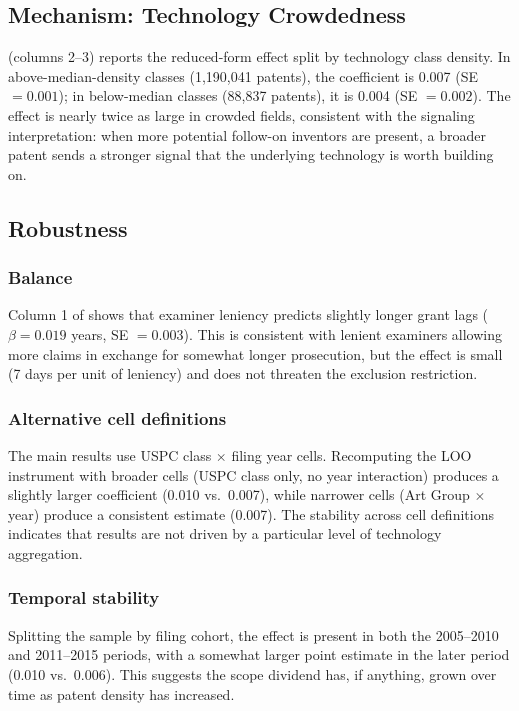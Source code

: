 \documentclass[12pt]{article}
\begin{document}
\subsection{Mechanism: Technology Crowdedness}

 (columns 2--3) reports the reduced-form effect split by technology class density. In above-median-density classes (1,190,041 patents), the coefficient is 0.007 (SE $= 0.001$); in below-median classes (88,837 patents), it is 0.004 (SE $= 0.002$). The effect is nearly twice as large in crowded fields, consistent with the signaling interpretation: when more potential follow-on inventors are present, a broader patent sends a stronger signal that the underlying technology is worth building on.

\subsection{Robustness}



\subsubsection*{Balance} Column 1 of  shows that examiner leniency predicts slightly longer grant lags ($\beta = 0.019$ years, SE $= 0.003$). This is consistent with lenient examiners allowing more claims in exchange for somewhat longer prosecution, but the effect is small (7 days per unit of leniency) and does not threaten the exclusion restriction.

\subsubsection*{Alternative cell definitions} The main results use USPC class $\times$ filing year cells. Recomputing the LOO instrument with broader cells (USPC class only, no year interaction) produces a slightly larger coefficient (0.010 vs.\ 0.007), while narrower cells (Art Group $\times$ year) produce a consistent estimate (0.007). The stability across cell definitions indicates that results are not driven by a particular level of technology aggregation.

\subsubsection*{Temporal stability} Splitting the sample by filing cohort, the effect is present in both the 2005--2010 and 2011--2015 periods, with a somewhat larger point estimate in the later period (0.010 vs.\ 0.006). This suggests the scope dividend has, if anything, grown over time as patent density has increased.
\end{document}
